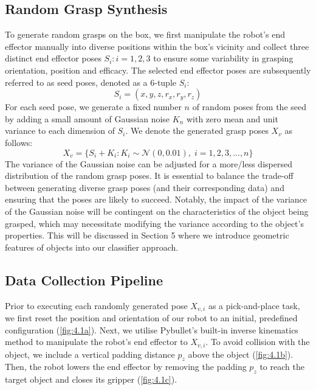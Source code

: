 \documentclass[11pt, a4paper]{report}
\begin{document}
\subsection{Random Grasp Synthesis}
\label{sec:4.2.1}
To generate random grasps on the box, we first manipulate the robot's end effector manually into diverse positions within the box's vicinity and collect three distinct end effector poses $S_i:i=1,2,3$ to ensure some variability in grasping orientation, position and efficacy. The selected end effector poses are subsequently referred to as seed poses, denoted as a 6-tuple $S_i$:
\begin{equation}
    S_i=(x,y,z,r_x,r_y,r_z)
\end{equation}
For each seed pose, we generate a fixed number $n$ of random poses from the seed by adding a small amount of Gaussian noise $K_n$ with zero mean and unit variance to each dimension of $S_i$. We denote the generated grasp poses $X_v$ as follows:
\begin{equation}
    X_v=\Big\{S_i+K_i:K_i\sim\mathcal{N}(0,0.01),\;i=1,2,3,...,n\Big\}
\end{equation}
The variance of the Gaussian noise can be adjusted for a more/less dispersed distribution of the random grasp poses. It is essential to balance the trade-off between generating diverse grasp poses (and their corresponding data) and ensuring that the poses are likely to succeed. Notably, the impact of the variance of the Gaussian noise will be contingent on the characteristics of the object being grasped, which may necessitate modifying the variance according to the object's properties. This will be discussed in Section 5 where we introduce geometric features of objects into our classifier approach.
 

\newpage
\subsection{Data Collection Pipeline}
\label{sec:4.2.2}
Prior to executing each randomly generated pose $X_{v,i}$ as a pick-and-place task, we first reset the position and orientation of our robot to an initial, predefined configuration (\ref{fig:4.1a}). Next, we utilise Pybullet's built-in inverse kinematics method to manipulate the robot's end effector to $X_{v,i}$. To avoid collision with the object, we include a vertical padding distance $p_z$ above the object (\ref{fig:4.1b}). Then, the robot lowers the end effector by removing the padding $p_z$ to reach the target object and closes its gripper (\ref{fig:4.1c}).
\end{document}
